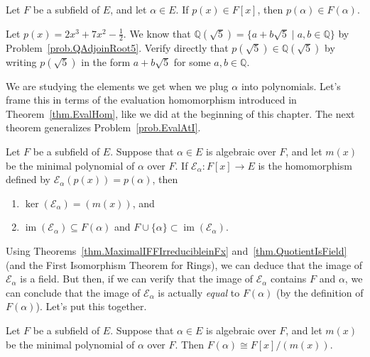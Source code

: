 \begin{theorem}
Let $F$ be a subfield of $E$, and let $\alpha\in E$. If $p(x)\in F[x]$, then $p(\alpha) \in F(\alpha)$.
\end{theorem}

\begin{problem}
Let $p(x) = 2x^3+7x^2-\frac{1}{2}$. We know that $\mathbb{Q}(\sqrt{5}) = \{a+b\sqrt{5}\mid a,b\in \mathbb{Q}\}$ by  Problem~\ref{prob.QAdjoinRoot5}. Verify directly that $p(\sqrt{5}) \in \mathbb{Q}(\sqrt{5})$ by writing $p(\sqrt{5})$ in the form $a+b\sqrt{5}$ for some $a,b\in \mathbb{Q}$.
\end{problem}

We are studying the elements we get when we plug $\alpha$ into polynomials. Let's frame this in terms of the evaluation homomorphism introduced in Theorem~\ref{thm.EvalHom}, like we did at the beginning of this chapter. The next theorem generalizes Problem~\ref{prob.EvalAtI}.

\begin{theorem}
Let $F$ be a subfield of $E$. Suppose that $\alpha\in E$ is algebraic over $F$, and let $m(x)$ be the minimal polynomial of $\alpha$ over $F$. If $\mathcal{E}_\alpha:F[x] \rightarrow E$ is the homomorphism defined by $\mathcal{E}_\alpha(p(x)) = p(\alpha)$, then 
\begin{enumerate}
\item $\ker\left(\mathcal{E}_\alpha\right)=(m(x))$, and
\item $\operatorname{im}\left(\mathcal{E}_\alpha\right)\subseteq F(\alpha)$ and $F\cup\{\alpha\}\subset \operatorname{im}\left(\mathcal{E}_\alpha\right)$.
\end{enumerate}
\end{theorem}

Using Theorems~\ref{thm.MaximalIFFIrreducibleinFx} and~\ref{thm.QuotientIsField} (and the First Isomorphism Theorem for Rings), we can deduce that the image of $\mathcal{E}_\alpha$ is a field. But then, if we can verify that the image of $\mathcal{E}_\alpha$ contains $F$ and $\alpha$, we can conclude that the image of $\mathcal{E}_\alpha$ is actually \emph{equal} to $F(\alpha)$ (by the definition of $F(\alpha)$). Let's put this together.

\begin{theorem}
Let $F$ be a subfield of $E$. Suppose that $\alpha\in E$ is algebraic over $F$, and let $m(x)$ be the minimal polynomial of $\alpha$ over $F$. Then 
$F(\alpha) \cong F[x]/(m(x)).$
\end{theorem}

